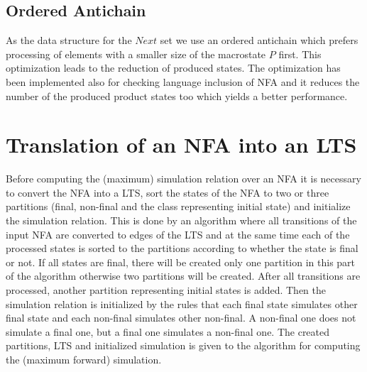 \subsection{Ordered Antichain}
As the data structure for the $Next$ set we use an ordered antichain which prefers processing of elements with a
smaller size of the macrostate $P$ first. This optimization leads to the reduction of produced states. The optimization has been implemented 
also for checking language inclusion of NFA and it reduces the number of the produced product states too which yields a better performance.


\section{Translation of an NFA into an LTS}
Before computing the (maximum) simulation relation over an NFA it is necessary to convert the NFA into a LTS, sort the states of the NFA to
two or three partitions (final, non-final and the class representing initial state) and initialize the simulation relation. This is done by an algorithm where 
all transitions of the input NFA are converted to edges of the LTS and at the same time each of the processed states is sorted to the partitions according to
whether the state is final or not. If all states are final, there will be created only one partition in this part of the algorithm otherwise two partitions will
be created. After all transitions are processed, another partition representing initial states is added. Then the simulation relation is initialized
by the rules that each final state simulates other final state and each non-final simulates other non-final. A non-final one does not simulate a final one, but 
a final one simulates a non-final one.
The created partitions, LTS and initialized simulation is given to the algorithm for computing the (maximum forward) simulation. 

